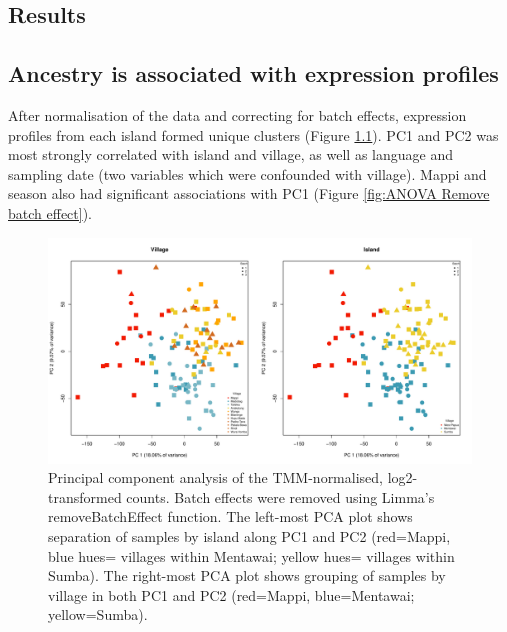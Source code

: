 \documentclass[12pt,a4paper,titlepage,twoside,openright]{book}
\begin{document}
\begin{mainmatter}
{{\chapter{Results}\label{}

\section{Ancestry is associated with expression profiles}

After normalisation of the data and correcting for batch effects, expression profiles from each island formed unique clusters (Figure \ref{fig:Remove Batch Effect Island and Village}). PC1 and PC2 was most strongly correlated with island and village, as well as language and sampling date (two variables which were confounded with village). Mappi and season also had significant associations with PC1 (Figure \ref{fig:ANOVA Remove batch effect}). 

\begin{figure}[htb!]
\centering
\includegraphics[width=\textwidth,height=\textheight,keepaspectratio]{Figures/samplingsiteAndVillagePCA.pdf}
\caption{Principal component analysis of the TMM-normalised, log2-transformed counts. Batch effects were removed using Limma's removeBatchEffect function. The left-most PCA plot shows separation of samples by island along PC1 and PC2 (red=Mappi, blue hues= villages within Mentawai; yellow hues= villages within Sumba). The right-most PCA plot shows grouping of samples by village in both PC1 and PC2 (red=Mappi, blue=Mentawai; yellow=Sumba).}
\label{fig:Remove Batch Effect Island and Village}
\end{figure}

}}
\end{mainmatter}
\end{document}
